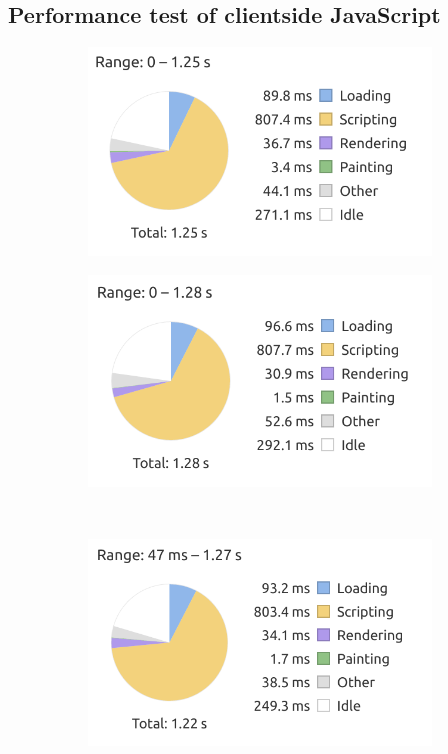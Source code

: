 \subsection{Performance test of clientside JavaScript}
\begin{figure}[H]
    \centering
    \begin{subfigure}{0.49\textwidth}
        \includegraphics[width=\textwidth]{figure/clientsidePerformance/graph1.png}
    \end{subfigure}
    \begin{subfigure}{0.49\textwidth}
        \includegraphics[width=\textwidth]{figure/clientsidePerformance/graph2.png}
    \end{subfigure}
    \\
    \begin{subfigure}{0.5\textwidth}
        \includegraphics[width=\textwidth]{figure/clientsidePerformance/graph3.png}
    \end{subfigure}
    

\end{figure}
